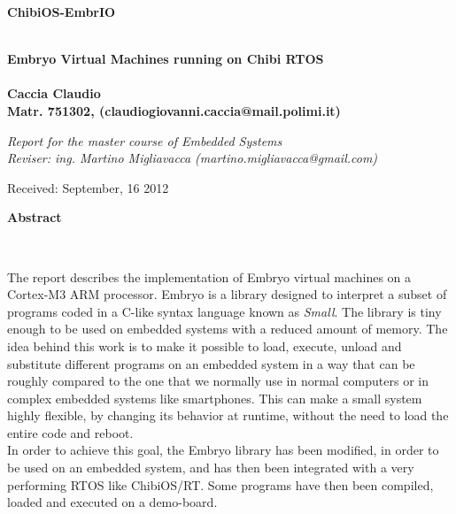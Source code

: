 \documentclass[a4paper,10pt]{article}
\newenvironment*{mytitle}{\begin{LARGE}\bf}{\end{LARGE}\\}%
\newenvironment*{mysubtitle}{\bf}{\\[1.5ex]}%
\newenvironment*{myabstract}{\begin{Large}\bf}{\end{Large}\\[2.5ex]}%
\begin{document}
\begin{mytitle}ChibiOS-EmbrIO\end{mytitle}
\begin{mysubtitle}Embryo Virtual Machines running on Chibi RTOS\end{mysubtitle}
%
%
\\
Caccia Claudio\\
Matr. 751302, (claudiogiovanni.caccia@mail.polimi.it)\\
\hspace{10ex}
\begin{flushright}
\emph{Report for the master course of Embedded Systems}\\
\emph{Reviser: ing. Martino Migliavacca (martino.migliavacca@gmail.com)}
\end{flushright}

Received: September, 16 2012\\
\hspace{10ex}

\begin{myabstract} Abstract \end{myabstract}

The report describes the implementation of Embryo virtual machines on a Cortex-M3 ARM processor. Embryo is a library designed to interpret a subset of programs coded in a C-like syntax language known as \textit{Small}. The library is tiny enough to be used on embedded systems with a reduced amount of memory. The idea behind this work is to make it possible to load, execute, unload and substitute different programs on an embedded system in a way that can be roughly compared to the one that we normally use in normal computers or in complex embedded systems like smartphones. This can make a small system highly flexible, by changing its behavior at runtime, without the need to load the entire code and reboot.\\
In order to achieve this goal, the Embryo library has been modified, in order to be used on an embedded system, and has then been integrated with a very performing RTOS like ChibiOS/RT. Some programs have then been compiled, loaded and executed on a demo-board.
\end{document}
